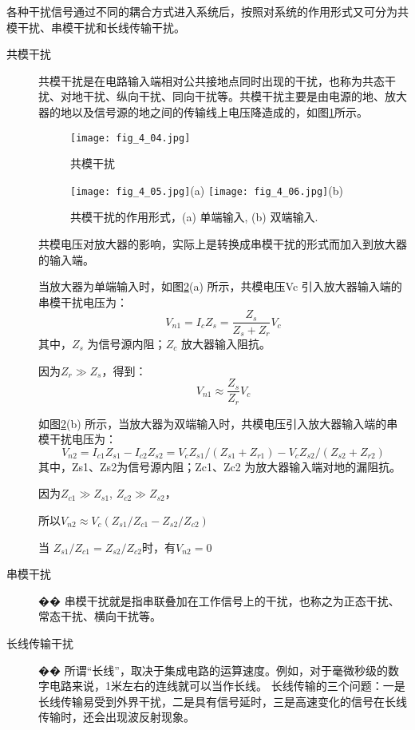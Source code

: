 各种干扰信号通过不同的耦合方式进入系统后，按照对系统的作用形式又可分为共模干扰、串模干扰和长线传输干扰。
\begin{description}
  \item[共模干扰]
  共模干扰是在电路输入端相对公共接地点同时出现的干扰，也称为共态干扰、对地干扰、纵向干扰、同向干扰等。共模干扰主要是由电源的地、放大器的地以及信号源的地之间的传输线上电压降造成的，如图\ref{fig_4_04}所示。
  \begin{figure}[h]
  \centering
  \texttt{[image: fig\_4\_04.jpg]}\\
  \caption{共模干扰}\label{fig_4_04}
\end{figure}



\begin{figure}[h]
  \centering
  \texttt{[image: fig\_4\_05.jpg]}(a)
  \texttt{[image: fig\_4\_06.jpg]}(b)\\
  \caption{共模干扰的作用形式，(a) 单端输入, (b) 双端输入.}\label{fig_4_05}
\end{figure}


\begin{remark}
共模电压对放大器的影响，实际上是转换成串模干扰的形式而加入到放大器的输入端。

当放大器为单端输入时，如图\ref{fig_4_05}(a) 所示，共模电压Vc 引入放大器输入端的串模干扰电压为：
\begin{equation}
  V_{n1}=I_cZ_s = \frac{Z_s}{Z_s+Z_r}V_c
\end{equation}
其中，$Z_s$ 为信号源内阻；$Z_c$ 放大器输入阻抗。

因为$Z_r\gg Z_s$，得到：
\begin{equation}
  V_{n1}\approx \frac{Z_s}{Z_r}V_c
\end{equation}

如图\ref{fig_4_05}(b) 所示，当放大器为双端输入时，共模电压引入放大器输入端的串模干扰电压为：
\begin{equation}
  V_{n2} = I_{c1}Z_{s1} - I_{c2}Z_{s2} = V_cZ_{s1}/(Z_{s1}+Z_{r1}) - V_{c}Z_{s2}/ (Z_{s2}+Z_{r2})
\end{equation}
其中，Zs1、Zs2为信号源内阻；Zc1、Zc2 为放大器输入端对地的漏阻抗。

因为$Z_{c1} \gg Z_{s1}$, $Z_{c2}\gg Z_{s2}$，

所以$V_{n2} \approx V_c( Z_{s1} / Z_{c1} - Z_{s2} / Z_{c2} )$

当 $Z_{s1} / Z_{c1} = Z_{s2} / Z_{c2}$时，有$V_{n2} = 0$

\end{remark}



  \item[串模干扰]��
  串模干扰就是指串联叠加在工作信号上的干扰，也称之为正态干扰、常态干扰、横向干扰等。
  \item[长线传输干扰]��
  所谓“长线”，取决于集成电路的运算速度。例如，对于毫微秒级的数字电路来说，1米左右的连线就可以当作长线。
  长线传输的三个问题：一是长线传输易受到外界干扰，二是具有信号延时，三是高速变化的信号在长线传输时，还会出现波反射现象。
\end{description}




